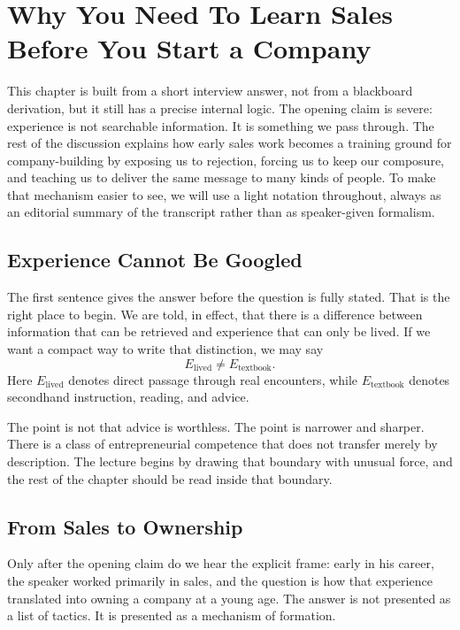 \chapter{Why You Need To Learn Sales Before You Start a Company}

This chapter is built from a short interview answer, not from a blackboard derivation, but it still has a precise internal logic. The opening claim is severe: experience is not searchable information. It is something we pass through. The rest of the discussion explains how early sales work becomes a training ground for company-building by exposing us to rejection, forcing us to keep our composure, and teaching us to deliver the same message to many kinds of people. To make that mechanism easier to see, we will use a light notation throughout, always as an editorial summary of the transcript rather than as speaker-given formalism.

\section{Experience Cannot Be Googled}

The first sentence gives the answer before the question is fully stated. That is the right place to begin. We are told, in effect, that there is a difference between information that can be retrieved and experience that can only be lived. If we want a compact way to write that distinction, we may say
\begin{equation}
E_{\mathrm{lived}} \neq E_{\mathrm{textbook}}.
\end{equation}
Here \(E_{\mathrm{lived}}\) denotes direct passage through real encounters, while \(E_{\mathrm{textbook}}\) denotes secondhand instruction, reading, and advice.

The point is not that advice is worthless. The point is narrower and sharper. There is a class of entrepreneurial competence that does not transfer merely by description. The lecture begins by drawing that boundary with unusual force, and the rest of the chapter should be read inside that boundary.

\section{From Sales to Ownership}

Only after the opening claim do we hear the explicit frame: early in his career, the speaker worked primarily in sales, and the question is how that experience translated into owning a company at a young age. The answer is not presented as a list of tactics. It is presented as a mechanism of formation.

